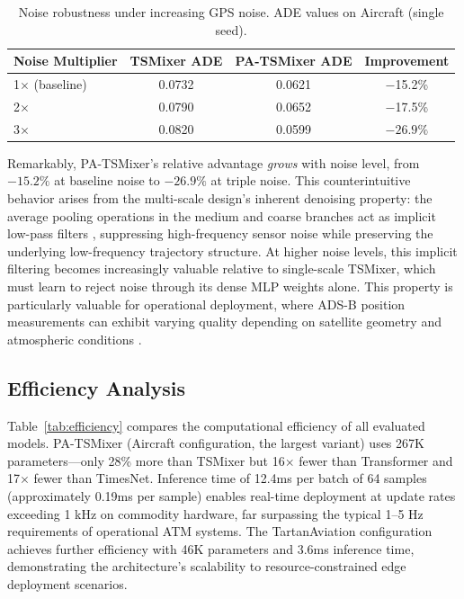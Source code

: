 \documentclass[letterpaper,journal]{IEEEtran}
\begin{document}
\begin{table}[!t]
\caption{Noise robustness under increasing GPS noise. ADE values on Aircraft
(single seed).\label{tab:noise}}
\centering
\footnotesize
\setlength{\tabcolsep}{3pt}
\begin{tabular}{lccc}
\toprule
Noise Multiplier & TSMixer ADE & PA-TSMixer ADE & Improvement \\
\midrule
1$\times$ (baseline) & 0.0732 & 0.0621 & $-$15.2\% \\
2$\times$             & 0.0790 & 0.0652 & $-$17.5\% \\
3$\times$             & 0.0820 & 0.0599 & $\mathbf{-26.9\%}$ \\
\bottomrule
\end{tabular}
\end{table}

Remarkably, PA-TSMixer's relative advantage \textit{grows} with noise level,
from $-15.2\%$ at baseline noise to $-26.9\%$ at triple noise. This
counterintuitive behavior arises from the multi-scale design's inherent
denoising property: the average pooling operations in the medium and coarse
branches act as implicit low-pass filters \cite{Bovik2005}, suppressing
high-frequency sensor noise while preserving the underlying low-frequency
trajectory structure. At higher noise levels, this implicit filtering becomes
increasingly valuable relative to single-scale TSMixer, which must learn to
reject noise through its dense MLP weights alone. This property is particularly
valuable for operational deployment, where ADS-B position measurements can
exhibit varying quality depending on satellite geometry and atmospheric
conditions \cite{Sun2020}.

\subsection{Efficiency Analysis}
Table~\ref{tab:efficiency} compares the computational efficiency of all evaluated
models. PA-TSMixer (Aircraft configuration, the largest variant) uses 267K
parameters---only 28\% more than TSMixer but 16$\times$ fewer than Transformer
and 17$\times$ fewer than TimesNet. Inference time of 12.4ms per batch of 64
samples (approximately 0.19ms per sample) enables real-time deployment at update
rates exceeding 1 kHz on commodity hardware, far surpassing the typical 1--5 Hz
requirements of operational ATM systems. The TartanAviation configuration achieves
further efficiency with 46K parameters and 3.6ms inference time, demonstrating
the architecture's scalability to resource-constrained edge deployment scenarios.
\end{document}
